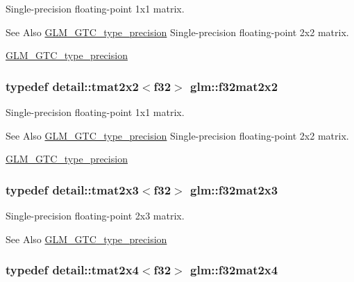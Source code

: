 Single-\/precision floating-\/point 1x1 matrix. 

\begin{DoxySeeAlso}{See Also}
\hyperlink{group__gtc__type__precision}{G\-L\-M\-\_\-\-G\-T\-C\-\_\-type\-\_\-precision} Single-\/precision floating-\/point 2x2 matrix. 

\hyperlink{group__gtc__type__precision}{G\-L\-M\-\_\-\-G\-T\-C\-\_\-type\-\_\-precision} 
\end{DoxySeeAlso}
\hypertarget{group__gtc__type__precision_ga0cd7f055e4070140afba92b7fbff1e04}{
\subsubsection[{f32mat2x2}]{\setlength{\rightskip}{0pt plus 5cm}typedef detail\-::tmat2x2$<$f32$>$ {\bf glm\-::f32mat2x2}}}\label{group__gtc__type__precision_ga0cd7f055e4070140afba92b7fbff1e04}


Single-\/precision floating-\/point 1x1 matrix. 

\begin{DoxySeeAlso}{See Also}
\hyperlink{group__gtc__type__precision}{G\-L\-M\-\_\-\-G\-T\-C\-\_\-type\-\_\-precision} Single-\/precision floating-\/point 2x2 matrix. 

\hyperlink{group__gtc__type__precision}{G\-L\-M\-\_\-\-G\-T\-C\-\_\-type\-\_\-precision} 
\end{DoxySeeAlso}
\hypertarget{group__gtc__type__precision_gae5592c8cdb8c7d7985d06af7d774e261}{
\subsubsection[{f32mat2x3}]{\setlength{\rightskip}{0pt plus 5cm}typedef detail\-::tmat2x3$<$f32$>$ {\bf glm\-::f32mat2x3}}}\label{group__gtc__type__precision_gae5592c8cdb8c7d7985d06af7d774e261}


Single-\/precision floating-\/point 2x3 matrix. 

\begin{DoxySeeAlso}{See Also}
\hyperlink{group__gtc__type__precision}{G\-L\-M\-\_\-\-G\-T\-C\-\_\-type\-\_\-precision} 
\end{DoxySeeAlso}
\hypertarget{group__gtc__type__precision_gaf86a2c845d7ced1b3c0c22a0b5b7e3e8}{
\subsubsection[{f32mat2x4}]{\setlength{\rightskip}{0pt plus 5cm}typedef detail\-::tmat2x4$<$f32$>$ {\bf glm\-::f32mat2x4}}}\label{group__gtc__type__precision_gaf86a2c845d7ced1b3c0c22a0b5b7e3e8}


